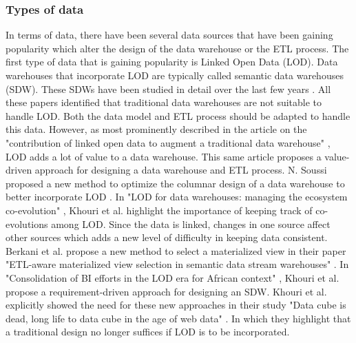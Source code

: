 \documentclass[11pt]{article}
\begin{document}
\subsubsection{Types of data}
In terms of data, there have been several data sources that have been gaining popularity which alter the design of the data warehouse or the ETL process. The first type of data that is gaining popularity is Linked Open Data (LOD). Data warehouses that incorporate LOD are typically called semantic data warehouses (SDW). These SDWs have been studied in detail over the last few years \cite{Berkani2020397, Berkani20181ETL, Khouri2018, Khouri20181, khouri2019data, Soussi2023762}. All these papers identified that traditional data warehouses are not suitable to handle LOD. Both the data model and ETL process should be adapted to handle this data. However, as most prominently described in the article on the "contribution of linked open data to augment a traditional data warehouse" \cite{Berkani2020397}, LOD adds a lot of value to a data warehouse. This same article proposes a value-driven approach for designing a data warehouse and ETL process. N. Soussi proposed a new method to optimize the columnar design of a data warehouse to better incorporate LOD \cite{Soussi2023762}. In "LOD for data warehouses: managing the ecosystem co-evolution" \cite{Khouri2018}, Khouri et al. highlight the importance of keeping track of co-evolutions among LOD. Since the data is linked, changes in one source affect other sources which adds a new level of difficulty in keeping data consistent. Berkani et al. propose a new method to select a materialized view in their paper "ETL-aware materialized view selection in semantic data stream warehouses" \cite{Berkani20181ETL}. In "Consolidation of BI efforts in the LOD era for African context" \cite{Khouri20181}, Khouri et al. propose a requirement-driven approach for designing an SDW. Khouri et al. explicitly showed the need for these new approaches in their study "Data cube is dead, long life to data cube in the age of web data" \cite{khouri2019data}. In which they highlight that a traditional design no longer suffices if LOD is to be incorporated. \\
\end{document}
